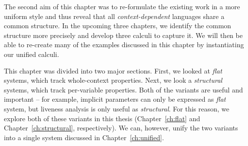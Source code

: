 The second aim of this chapter was to re-formulate the existing work in a more uniform style and thus
reveal that all \emph{context-dependent} languages share a common structure. In the upcoming three 
chapters, we identify the common structure more precisely and develop three calculi to capture it. We 
will then be able to re-create many of the examples discussed in this chapter by instantiating our 
unified calculi.

This chapter was divided into two major sections. First, we looked at \emph{flat} systems, which
track whole-context properties. Next, we look a \emph{structural} systems, which track per-variable
properties. Both of the variants are useful and important -- for example, implicit parameters can
only be expressed as \emph{flat} system, but liveness analysis is only useful as \emph{structural}.
For this reason, we explore both of these variants in this thesis (Chapter~\ref{ch:flat} and 
Chapter~\ref{ch:structural}, respectively). We can, however, unify the two variants into a single
system discussed in Chapter~\ref{ch:unified}.

